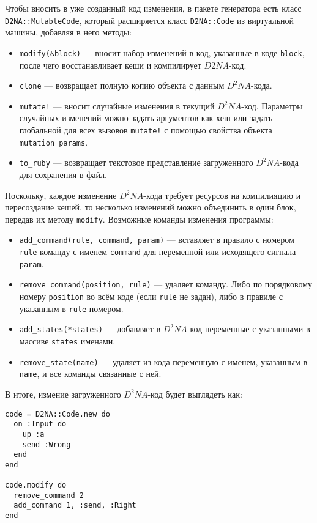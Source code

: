 \documentclass[utf8,a5paper,portrait,12pt]{eskdtext}
\begin{document}
Чтобы вносить в уже созданный код изменения, в пакете генератора есть класс
\texttt{D2NA::MutableCode}, который расширяется класс \texttt{D2NA::Code} из
виртуальной машины, добавляя в него методы:
\begin{itemize}
  \item \texttt{modify(\&block)} — вносит набор изменений в код, указанные в
        коде \texttt{block}, после чего восстанавливает кеши и компилирует
        $D2NA$-код.
  \item \texttt{clone} — возвращает полную копию объекта с данным $D^2NA$-кода.
  \item \texttt{mutate!} — вносит случайные изменения в текущий $D^2NA$-код.
        Параметры случайных изменений можно задать аргументов как хеш или
        задать глобальной для всех вызовов \texttt{mutate!} с помощью свойства
        объекта \texttt{mutation\_params}.
  \item \texttt{to\_ruby} — возвращает текстовое представление загруженного
        $D^2NA$-кода для сохранения в файл.
\end{itemize}

Поскольку, каждое изменение $D^2NA$-кода требует ресурсов на компилияцию и
пересоздание кешей, то несколько изменений можно объединить в один блок, передав
их методу \texttt{modify}. Возможные команды изменения программы:
\begin{itemize}
  \item \texttt{add\_command(rule, command, param)} — вставляет в
        правило с номером \texttt{rule} команду с именем
        \texttt{command} для переменной или исходящего сигнала
        \texttt{param}.
  \item \texttt{remove\_command(position, rule)} — удаляет команду. Либо по
        порядковому номеру \texttt{position} во всём коде (если \texttt{rule}
        не задан), либо в правиле с указанным в \texttt{rule} номером.
  \item \texttt{add\_states(*states)} — добавляет в $D^2NA$-код переменные с
        указанными в массиве \texttt{states} именами.
  \item \texttt{remove\_state(name)} — удаляет из кода переменную с именем,
        указанным в \texttt{name}, и все команды связанные с ней.
\end{itemize}

В итоге, измение загруженного $D^2NA$-код будет выглядеть как:
\begin{verbatim}
code = D2NA::Code.new do
  on :Input do
    up :a
    send :Wrong
  end
end

code.modify do
  remove_command 2
  add_command 1, :send, :Right
end
\end{verbatim}
\end{document}
